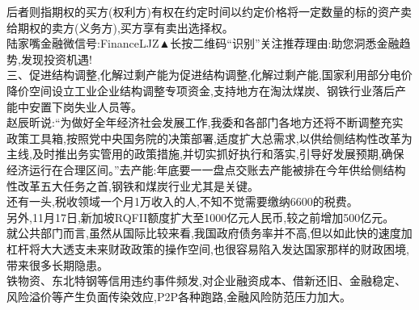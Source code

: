 \documentclass[runningheads,a4paper]{llncs}
\begin{document}
\begin{CJK*}{UTF8}{gbsn}
后者则指\colorbox{green!30}{期权}的买方(权利方)有权在约定时间以约定价格将一定数量的\colorbox{green!30}{标的资产}卖给\colorbox{green!30}{期权}的卖方(义务方),买方享有\colorbox{blue!30}{卖出选择权}。\\
\colorbox{green!30}{陆家嘴金融}微信号:\colorbox{blue!30}{FinanceLJZ}▲长按二维码“识别”关注推荐理由:助您洞悉\colorbox{green!30}{金融趋势},发现\colorbox{green!30}{投资机遇}!\\
三、促进\colorbox{blue!30}{结构调整},化解\colorbox{blue!30}{过剩产能}为促进\colorbox{blue!30}{结构调整},化解\colorbox{blue!30}{过剩产能},\colorbox{blue!30}{国家}利用部分\colorbox{green!30}{电价}\colorbox{blue!30}{降价空间}设立\colorbox{green!30}{工业企业结构调整专项资金},支持地方在淘汰\colorbox{green!30}{煤炭}、\colorbox{green!30}{钢铁行业}\colorbox{blue!30}{落后产能}中安置\colorbox{blue!30}{下岗}\colorbox{green!30}{失业人员}等。\\
\colorbox{green!30}{赵辰昕}说:“为做好\colorbox{blue!30}{全年经济社会发展工作},我\colorbox{blue!30}{委}和各\colorbox{blue!30}{部门}各\colorbox{blue!30}{地方}还将不断调整充实\colorbox{blue!30}{政策工具箱},按照\colorbox{green!30}{党中央国务院}的\colorbox{blue!30}{决策部署},适度扩大\colorbox{blue!30}{总需求},以\colorbox{green!30}{供给侧结构性改革}为主线,及时推出务实管用的政策措施,并切实抓好执行和落实,引导好发展预期,确保\colorbox{blue!30}{经济}运行在合理区间。”\colorbox{green!30}{去产能}:年底要一一盘点交账\colorbox{blue!30}{去产能}被排在今年\colorbox{green!30}{供给侧结构性改革}五大任务之首,\colorbox{green!30}{钢铁}和\colorbox{green!30}{煤炭行业}尤其是关键。\\
还有一头,\colorbox{green!30}{税收领域}一个月1万收入的人,不知不觉需要缴纳6600的\colorbox{green!30}{税费}。\\
另外,11月17日,\colorbox{green!30}{新加坡RQFII额度}扩大至1000亿元人民币,较之前增加500亿元。\\
就\colorbox{blue!30}{公共部门}而言,虽然从国际比较来看,我国\colorbox{green!30}{政府债务率}并不高,但以如此快的速度\colorbox{green!30}{加杠杆}将大大\colorbox{blue!30}{透支}\colorbox{red!30}{未来}\colorbox{green!30}{财政政策}的操作空间,也很容易陷入\colorbox{red!30}{发达国家}那样的\colorbox{green!30}{财政}\colorbox{red!30}{困境},带来很多长期隐患。\\
\colorbox{green!30}{铁物资}、\colorbox{green!30}{东北特钢}等信用违约事件频发,对\colorbox{blue!30}{企业}\colorbox{green!30}{融资成本}、借新还旧、\colorbox{green!30}{金融}\colorbox{blue!30}{稳定}、\colorbox{green!30}{风险溢价}等产生负面传染效应,\colorbox{green!30}{P2P}各种跑路,\colorbox{green!30}{金融风险防范压力}加大。\\

\end{CJK*}
\end{document}
